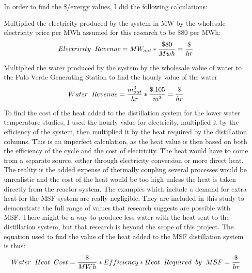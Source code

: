 \documentclass[12pt]{UIdahoMastersThesis}
\begin{document}
In order to find the \$/exergy values, I did the following calculations:

Multiplied the electricity produced by the system in MW by the wholesale electricity price per MWh assumed for this research to be \$80 per MWh:
\begin{equation*}
Electricity\hspace{.2cm} Revenue=MW_{out}*\frac{\$80}{Mwh}=\frac{\$}{hr}
\end{equation*}

Multiplied the water produced by the system by the wholesale value of water to the Palo Verde Generating Station to find the hourly value of the water
\begin{equation*}
\label{water}
Water\hspace{.2cm} Revenue=\frac{m^3_{out}}{hr}*\frac{\$.105}{m^3}=\frac{\$}{hr}
\end{equation*}

To find the cost of the heat added to the distillation system for the lower water temperature studies, I used the hourly value for electricity, multiplied it by the efficiency of the system, then multiplied it by the heat required by the distillation columns.  This is an imperfect calculation, as the heat value is then based on both the efficiency of the cycle and the cost of electricity.  The heat would have to come from a separate source, either through electricity conversion or more direct heat.  The reality is the added expense of thermally coupling several processes would be unrealistic and the cost of the heat would be too high unless the heat is taken directly from the reactor system.  The examples which include a demand for extra heat for the MSF system are really negligible.  They are included in this study to demonstrate the full range of values that research suggests are possible with MSF.  There might be a way to produce less water with the heat sent to the distillation system, but that research is beyond the scope of this project.  The equation used to find the value of the heat added to the MSF distillation system is thus:
\begin{equation*}
Water\hspace{.2cm} Heat \hspace{.2cm} Cost=\frac{\$}{MWh}*Efficiency*Heat \hspace{.2cm}Required  \hspace{.2cm} by  \hspace{.2cm} MSF=\frac{\$}{hr}
\end{equation*}
\end{document}
